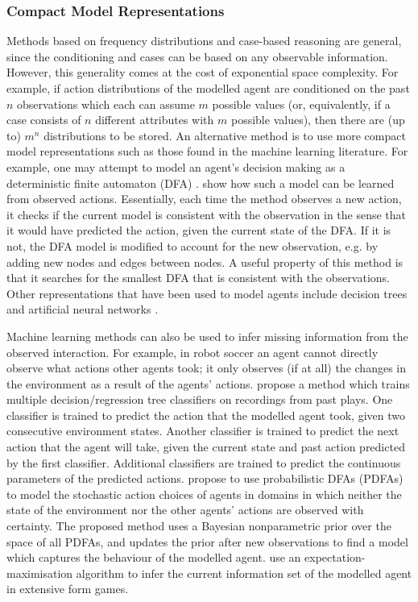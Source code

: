\documentclass[final,1p,times,authoryear]{elsarticle}
\begin{document}
		\subsubsection{Compact Model Representations}

Methods based on frequency distributions and case-based reasoning are general, since the conditioning and cases can be based on any observable information. However, this generality comes at the cost of exponential space complexity. For example, if action distributions of the modelled agent are conditioned on the past $n$ observations which each can assume $m$ possible values (or, equivalently, if a case consists of $n$ different attributes with $m$ possible values), then there are (up to) $m^n$ distributions to be stored. An alternative method is to use more compact model representations such as those found in the machine learning literature. For example, one may attempt to model an agent's decision making as a deterministic finite automaton (DFA) \citep{cm1998dfa,cm1996dfa,mgr1995}. \citet{cm1996dfa} show how such a model can be learned from observed actions. Essentially, each time the method observes a new action, it checks if the current model is consistent with the observation in the sense that it would have predicted the action, given the current state of the DFA. If it is not, the DFA model is modified to account for the new observation, e.g. by adding new nodes and edges between nodes. A useful property of this method is that it searches for the smallest DFA that is consistent with the observations. Other representations that have been used to model agents include decision trees \citep{bskr2013} and artificial neural networks \citep{alphago2016,dbss2000}.

Machine learning methods can also be used to infer missing information from the observed interaction. For example, in robot soccer an agent cannot directly observe what actions other agents took; it only observes (if at all) the changes in the environment as a result of the agents' actions. \citet{lasb2009} propose a method which trains multiple decision/regression tree classifiers on recordings from past plays. One classifier is trained to predict the action that the modelled agent took, given two consecutive environment states. Another classifier is trained to predict the next action that the agent will take, given the current state and past action predicted by the first classifier. Additional classifiers are trained to predict the continuous parameters of the predicted actions. \citet{pg2017} propose to use probabilistic DFAs (PDFAs) to model the stochastic action choices of agents in domains in which neither the state of the environment nor the other agents' actions are observed with certainty. The proposed method uses a Bayesian nonparametric prior over the space of all PDFAs, and updates the prior after new observations to find a model which captures the behaviour of the modelled agent. \citet{ms2017} use an expectation-maximisation algorithm to infer the current information set of the modelled agent in extensive form games.
\end{document}
